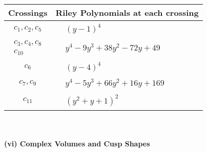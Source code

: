 \documentclass[1p]{elsarticle_modified}
\theoremstyle{definition}
\begin{document}
\begin{tabular}{m{50pt}|m{274pt}}
Crossings & \hspace{64pt}Riley Polynomials at each crossing \\
\hline $$\begin{aligned}c_{1},c_{2},c_{5}\end{aligned}$$&$\begin{aligned}
&(y-1)^4
\end{aligned}$\\
\hline $$\begin{aligned}c_{3},c_{4},c_{8}\\c_{10}\end{aligned}$$&$\begin{aligned}
&y^4-9 y^3+38 y^2-72 y+49
\end{aligned}$\\
\hline $$\begin{aligned}c_{6}\end{aligned}$$&$\begin{aligned}
&(y-4)^4
\end{aligned}$\\
\hline $$\begin{aligned}c_{7},c_{9}\end{aligned}$$&$\begin{aligned}
&y^4-5 y^3+66 y^2+16 y+169
\end{aligned}$\\
\hline $$\begin{aligned}c_{11}\end{aligned}$$&$\begin{aligned}
&(y^2+y+1)^2
\end{aligned}$\\
\hline
\end{tabular}\\~\\
\newpage\flushleft \textbf{(vi) Complex Volumes and Cusp Shapes}
\end{document}
